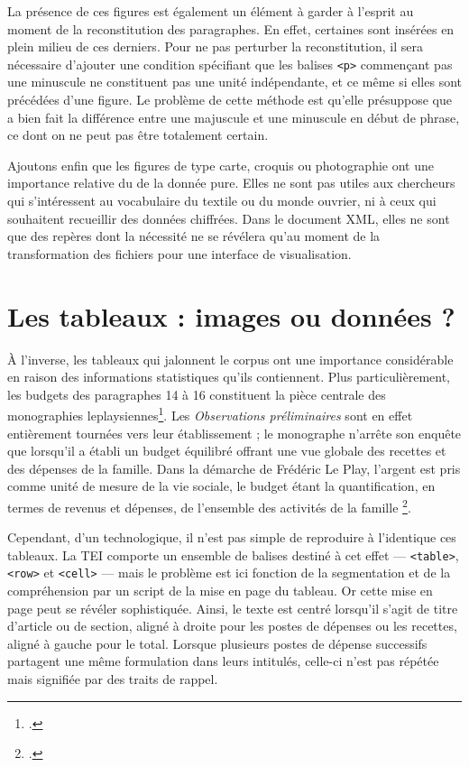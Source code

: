 La présence de ces figures est également un élément à garder à l'esprit au moment de la reconstitution des paragraphes. En effet, certaines sont insérées en plein milieu de ces derniers. Pour ne pas perturber la reconstitution, il sera nécessaire d'ajouter une condition spécifiant que les balises \texttt{<p>} commençant pas une minuscule ne constituent pas une unité indépendante, et ce même si elles sont précédées d'une figure. Le problème de cette méthode est qu'elle présuppose que \lse{} a bien fait la différence entre une majuscule et une minuscule en début de phrase, ce dont on ne peut pas être totalement certain.

Ajoutons enfin que les figures de type carte, croquis ou photographie ont une importance relative du \pov{} de la donnée pure. Elles ne sont pas utiles aux chercheurs qui s'intéressent au vocabulaire du textile ou du monde ouvrier, ni à ceux qui souhaitent recueillir des données chiffrées. Dans le document XML, elles ne sont que des repères dont la nécessité ne se révélera qu'au moment de la transformation des fichiers pour une interface de visualisation.

\section{Les tableaux : images ou données ?}

À l'inverse, les tableaux qui jalonnent le corpus ont une importance considérable en raison des informations statistiques qu'ils contiennent. Plus particulièrement, les budgets des paragraphes 14 à 16 constituent \og la pièce centrale \fg{} des monographies leplaysiennes\footcite[p. 317]{savoyecontinuateurs}. Les \textit{Observations préliminaires} sont en effet entièrement tournées vers leur établissement ; le monographe n'arrête son enquête que lorsqu'il a établi un budget équilibré offrant une vue globale des recettes et des dépenses de la famille. Dans la démarche de Frédéric Le Play, \og l'argent est pris comme unité de mesure de la vie sociale, le budget étant la quantification, en termes de revenus et dépenses, de l'ensemble des activités de la famille \fg\footcite[p. 317]{savoyecontinuateurs}.

Cependant, d'un \pov{} technologique, il n'est pas simple de reproduire à l'identique ces tableaux. La TEI comporte un ensemble de balises destiné à cet effet --- \texttt{<table>}, \texttt{<row>} et \texttt{<cell>} --- mais le problème est ici fonction de la segmentation et de la compréhension par un script de la mise en page du tableau. Or cette mise en page peut se révéler sophistiquée. Ainsi, le texte est centré lorsqu'il s'agit de titre d'article ou de section, aligné à droite pour les postes de dépenses ou les recettes, aligné à gauche pour le total. Lorsque plusieurs postes de dépense successifs partagent une même formulation dans leurs intitulés, celle-ci n'est pas répétée mais signifiée par des traits de rappel.

